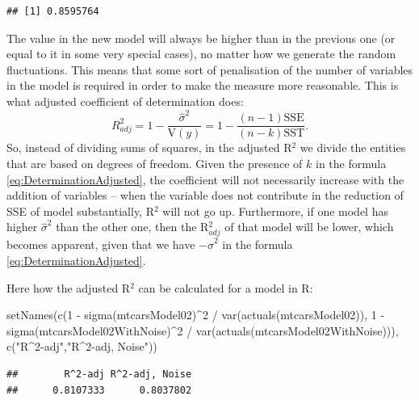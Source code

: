 \documentclass[
]{book}
\newenvironment{Shaded}{\begin{snugshade}}{\end{snugshade}}
\newcommand{\DecValTok}[1]{\textcolor[rgb]{0.00,0.00,0.81}{#1}}
\newcommand{\FunctionTok}[1]{\textcolor[rgb]{0.00,0.00,0.00}{#1}}
\newcommand{\NormalTok}[1]{#1}
\newcommand{\SpecialCharTok}[1]{\textcolor[rgb]{0.00,0.00,0.00}{#1}}
\newcommand{\StringTok}[1]{\textcolor[rgb]{0.31,0.60,0.02}{#1}}
\theoremstyle{definition}
\theoremstyle{definition}
\theoremstyle{definition}
\theoremstyle{definition}
\theoremstyle{remark}
\begin{document}
\begin{verbatim}
## [1] 0.8595764
\end{verbatim}

The value in the new model will always be higher than in the previous one (or equal to it in some very special cases), no matter how we generate the random fluctuations. This means that some sort of penalisation of the number of variables in the model is required in order to make the measure more reasonable. This is what adjusted coefficient of determination does:
\begin{equation}
    R^2_{adj} = 1 - \frac{\hat{\sigma}^2}{\mathrm{V}(y)} = 1 - \frac{(n-1)\mathrm{SSE}}{(n-k)\mathrm{SST}} .
    \label{eq:DeterminationAdjusted}
\end{equation}
So, instead of dividing sums of squares, in the adjusted R\(^2\) we divide the entities that are based on degrees of freedom. Given the presence of \(k\) in the formula \eqref{eq:DeterminationAdjusted}, the coefficient will not necessarily increase with the addition of variables -- when the variable does not contribute in the reduction of SSE of model substantially, R\(^2\) will not go up. Furthermore, if one model has higher \(\hat{\sigma}^2\) than the other one, then the R\(^2_{adj}\) of that model will be lower, which becomes apparent, given that we have \(-\hat{\sigma}^2\) in the formula \eqref{eq:DeterminationAdjusted}.

Here how the adjusted R\(^2\) can be calculated for a model in R:

\begin{Shaded}
\begin{Highlighting}[]
\FunctionTok{setNames}\NormalTok{(}\FunctionTok{c}\NormalTok{(}\DecValTok{1} \SpecialCharTok{{-}} \FunctionTok{sigma}\NormalTok{(mtcarsModel02)}\SpecialCharTok{\^{}}\DecValTok{2} \SpecialCharTok{/} \FunctionTok{var}\NormalTok{(}\FunctionTok{actuals}\NormalTok{(mtcarsModel02)),}
           \DecValTok{1} \SpecialCharTok{{-}} \FunctionTok{sigma}\NormalTok{(mtcarsModel02WithNoise)}\SpecialCharTok{\^{}}\DecValTok{2} \SpecialCharTok{/} \FunctionTok{var}\NormalTok{(}\FunctionTok{actuals}\NormalTok{(mtcarsModel02WithNoise))),}
         \FunctionTok{c}\NormalTok{(}\StringTok{"R\^{}2{-}adj"}\NormalTok{,}\StringTok{"R\^{}2{-}adj, Noise"}\NormalTok{))}
\end{Highlighting}
\end{Shaded}

\begin{verbatim}
##        R^2-adj R^2-adj, Noise 
##      0.8107333      0.8037802
\end{verbatim}
\end{document}
